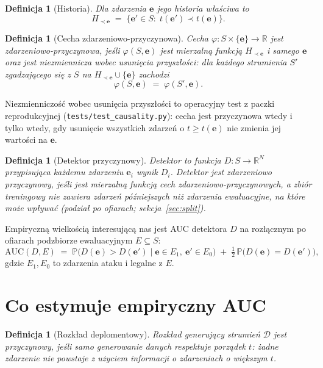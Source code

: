 \documentclass[11pt]{article}
\newtheorem{definition}[theorem]{Definicja}
\newcommand{\Prob}{\mathbb{P}}
\newcommand{\R}{\mathbb{R}}
\newcommand{\event}{\mathbf{e}}
\newcommand{\strict}{\prec}
\begin{document}
\begin{definition}[Historia]
Dla zdarzenia $\event$ jego \emph{historia właściwa} to
\[
H_{\strict \event} \;=\; \{\event'\in S:\; t(\event')\strict t(\event)\}.
\]
\end{definition}

\begin{definition}[Cecha zdarzeniowo-przyczynowa]
\label{def:causal-feature}
Cecha $\varphi\colon S\times \{\event\}\to\R$ jest
\emph{zdarzeniowo-przyczynowa}, jeśli $\varphi(S,\event)$ jest mierzalną
funkcją $H_{\strict \event}$ i samego $\event$ oraz jest
\emph{niezmiennicza wobec usunięcia przyszłości}: dla każdego strumienia
$S'$ zgadzającego się z $S$ na $H_{\strict\event}\cup\{\event\}$ zachodzi
\[
\varphi(S,\event) \;=\; \varphi(S',\event).
\]
\end{definition}

Niezmienniczość wobec usunięcia przyszłości to operacyjny test z paczki
reprodukcyjnej (\texttt{tests/test\_causality.py}): cecha jest
przyczynowa wtedy i tylko wtedy, gdy usunięcie wszystkich zdarzeń o
$t\ge t(\event)$ nie zmienia jej wartości na $\event$.

\begin{definition}[Detektor przyczynowy]
\label{def:causal-detector}
\emph{Detektor} to funkcja $D\colon S\to\R^N$ przypisująca każdemu
zdarzeniu $\event_i$ wynik $D_i$. Detektor jest \emph{zdarzeniowo
przyczynowy}, jeśli jest mierzalną funkcją cech
zdarzeniowo-przyczynowych, a zbiór treningowy nie zawiera zdarzeń
późniejszych niż zdarzenia ewaluacyjne, na które może wpływać
(podział po ofiarach; sekcja~\ref{sec:split}).
\end{definition}

Empiryczną wielkością interesującą nas jest AUC detektora $D$ na
rozłącznym po ofiarach podzbiorze ewaluacyjnym $E\subseteq S$:
\[
\mathrm{AUC}(D,E) \;=\;
\Prob\big(D(\event) > D(\event') \mid \event\in E_1,\ \event'\in E_0\big)
\;+\;\tfrac12\,\Prob\big(D(\event)=D(\event')\big),
\]
gdzie $E_1,E_0$ to zdarzenia ataku i legalne z $E$.

\section{Co estymuje empiryczny AUC}
\label{sec:what-estimates}

\begin{definition}[Rozkład deplomentowy]
Rozkład generujący strumień $\mathcal{D}$ jest \emph{przyczynowy}, jeśli
samo generowanie danych respektuje porządek $t$: żadne zdarzenie nie
powstaje z użyciem informacji o zdarzeniach o większym $t$.
\end{definition}
\end{document}
